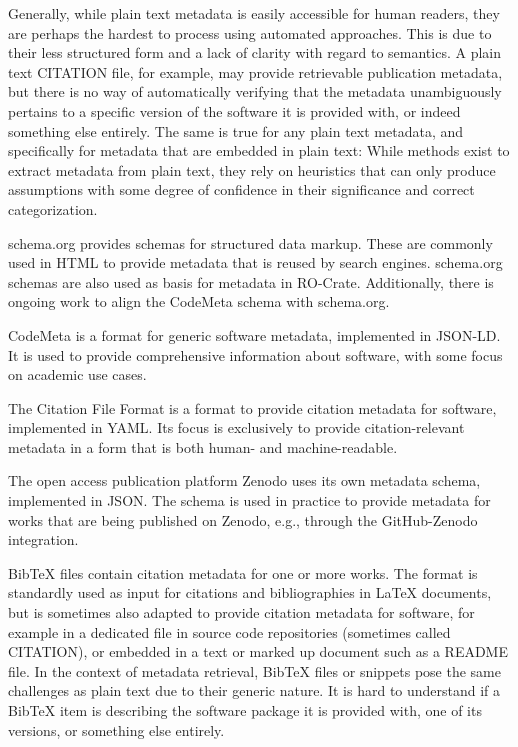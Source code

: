 \documentclass{article}
\begin{document}
Generally, while plain text metadata is easily accessible for human readers, they are perhaps the hardest to process using automated approaches. This is due to their less structured form and a lack of clarity with regard to semantics. A plain text CITATION file, for example, may provide retrievable publication metadata, but there is no way of automatically verifying that the metadata unambiguously pertains to a specific version of the software it is provided with, or indeed something else entirely. The same is true for any plain text metadata, and specifically for metadata that are embedded in plain text: While methods exist to extract metadata from plain text, they rely on heuristics that can only produce assumptions with some degree of confidence in their significance and correct categorization.



\label{subsubsec:metadata-formats-schema-org}
schema.org\cite{138880/PI4Z5AFK} provides schemas for structured data markup. These are commonly used in HTML to provide metadata that is reused by search engines. schema.org schemas are also used as basis for metadata in RO-Crate\cite{138880/S5F3HZ96}. Additionally, there is ongoing work to align the CodeMeta schema\cite{138880/NBDB4VHJ} with schema.org.



\label{subsubsec:metadata-formats-codemeta}
CodeMeta \cite{138880/NBDB4VHJ} is a format for generic software metadata, implemented in JSON-LD. It is used to provide comprehensive information about software, with some focus on academic use cases.



\label{subsubsec:metadata-formats-cff}
The Citation File Format \cite{138880/M4MT8YLA} is a format to provide citation metadata for software, implemented in YAML. Its focus is exclusively to provide citation-relevant metadata in a form that is both human- and machine-readable.



\label{subsubsec:metadata-formats-zenodo-json}
The open access publication platform Zenodo \cite{138880/BG42K9CX} uses its own metadata schema, implemented in JSON. The schema is used in practice to provide metadata for works that are being published on Zenodo, e.g., through the GitHub-Zenodo integration.



\label{subsubsec:metadata-formats-bibtex}
BibTeX files contain citation metadata for one or more works. The format is standardly used as input for citations and bibliographies in LaTeX documents, but is sometimes also adapted to provide citation metadata for software, for example in a dedicated file in source code repositories (sometimes called CITATION), or embedded in a text or marked up document such as a README file. In the context of metadata retrieval, BibTeX files or snippets pose the same challenges as plain text due to their generic nature. It is hard to understand if a BibTeX item is describing the software package it is provided with, one of its versions, or something else entirely.
\end{document}
